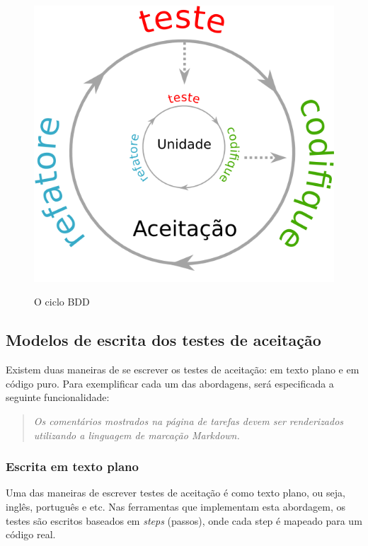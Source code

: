 \begin{figure}[h]
  \center
  \caption{O ciclo BDD}
  \includegraphics[scale=0.45]{images/ciclo-bdd}
  \label{img:ciclo-bdd}
\end{figure}


\subsection{Modelos de escrita dos testes de aceitação}
\label{sub:modelos_de_escrita_dos_testes_de_aceitacao}

Existem duas maneiras de se escrever os testes de aceitação: em texto plano e em código puro. Para exemplificar cada um das abordagens, será especificada a seguinte funcionalidade:

\begin{quote}
\textit{Os comentários mostrados na página de tarefas devem ser renderizados utilizando a linguagem de marcação Markdown.}
\end{quote}

\subsubsection{Escrita em texto plano} %
\label{subsub:escrita_em_texto_plano}

Uma das maneiras de escrever testes de aceitação é como texto plano, ou seja, inglês, português e etc. Nas ferramentas que implementam esta abordagem, os testes são escritos baseados em \textit{steps} (passos), onde cada step é mapeado para um código real.


